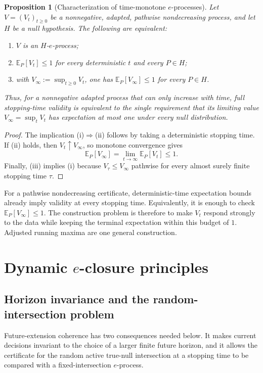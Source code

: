 \documentclass[11pt]{article}
\numberwithin{equation}{section}
\theoremstyle{plain}
\newtheorem{proposition}[theorem]{Proposition}
\theoremstyle{definition}
\newcommand{\E}{\mathbb E}
\begin{document}
\begin{proposition}[Characterization of time-monotone $e$-processes]\label{prop:monotone-eprocess-characterization}
Let $V=(V_t)_{t\geq0}$ be a nonnegative, adapted, pathwise nondecreasing process, and let $H$ be a null hypothesis. The following are equivalent:
\begin{enumerate}
\item[(i)] $V$ is an $H$-$e$-process;
\item[(ii)] $\E_P[V_t]\leq1$ for every deterministic $t$ and every $P\in H$;
\item[(iii)] with $V_\infty:=\sup_{t\geq0}V_t$, one has $\E_P[V_\infty]\leq1$ for every $P\in H$.
\end{enumerate}
Thus, for a nonnegative adapted process that can only increase with time, full stopping-time validity is equivalent to the single requirement that its limiting value $V_\infty=\sup_t V_t$ has expectation at most one under every null distribution.
\end{proposition}

\begin{proof}
The implication (i)$\Rightarrow$(ii) follows by taking a deterministic stopping time. If (ii) holds, then $V_t\uparrow V_\infty$, so monotone convergence gives
\[
  \E_P[V_\infty]=\lim_{t\to\infty}\E_P[V_t]\leq1.
\]
Finally, (iii) implies (i) because $V_\tau\leq V_\infty$ pathwise for every almost surely finite stopping time $\tau$.
\end{proof}

For a pathwise nondecreasing certificate, deterministic-time expectation bounds already imply validity at every stopping time. Equivalently, it is enough to check $\E_P[V_\infty]\leq1$. The construction problem is therefore to make $V_t$ respond strongly to the data while keeping the terminal expectation within this budget of $1$. Adjusted running maxima are one general construction.

\section{Dynamic \texorpdfstring{$e$}{e}-closure principles}\label{sec:dynamic-principles}

\subsection{Horizon invariance and the random-intersection problem}\label{sec:random-intersection}

Future-extension coherence has two consequences needed below. It makes current decisions invariant to the choice of a larger finite future horizon, and it allows the certificate for the random active true-null intersection at a stopping time to be compared with a fixed-intersection $e$-process.
\end{document}
